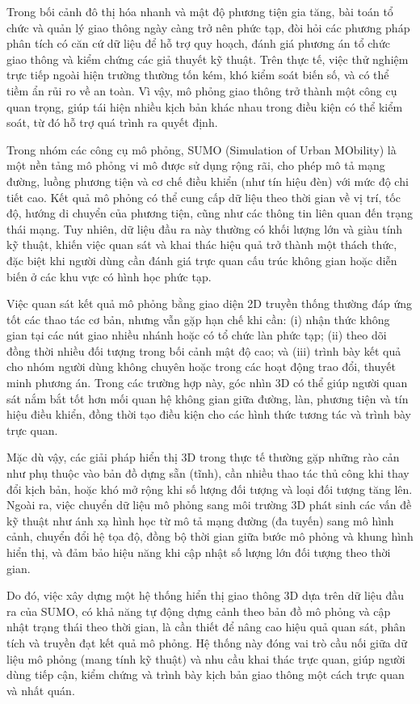 \documentclass[../DoAn.tex]{subfiles}
\begin{document}
Trong bối cảnh đô thị hóa nhanh và mật độ phương tiện gia tăng, bài toán tổ chức và quản lý giao thông ngày càng trở nên phức tạp, đòi hỏi các phương pháp phân tích có căn cứ dữ liệu để hỗ trợ quy hoạch, đánh giá phương án tổ chức giao thông và kiểm chứng các giả thuyết kỹ thuật. Trên thực tế, việc thử nghiệm trực tiếp ngoài hiện trường thường tốn kém, khó kiểm soát biến số, và có thể tiềm ẩn rủi ro về an toàn. Vì vậy, mô phỏng giao thông trở thành một công cụ quan trọng, giúp tái hiện nhiều kịch bản khác nhau trong điều kiện có thể kiểm soát, từ đó hỗ trợ quá trình ra quyết định.

Trong nhóm các công cụ mô phỏng, SUMO (Simulation of Urban MObility) là một nền tảng mô phỏng vi mô được sử dụng rộng rãi, cho phép mô tả mạng đường, luồng phương tiện và cơ chế điều khiển (như tín hiệu đèn) với mức độ chi tiết cao. Kết quả mô phỏng có thể cung cấp dữ liệu theo thời gian về vị trí, tốc độ, hướng di chuyển của phương tiện, cũng như các thông tin liên quan đến trạng thái mạng. Tuy nhiên, dữ liệu đầu ra này thường có khối lượng lớn và giàu tính kỹ thuật, khiến việc quan sát và khai thác hiệu quả trở thành một thách thức, đặc biệt khi người dùng cần đánh giá trực quan cấu trúc không gian hoặc diễn biến ở các khu vực có hình học phức tạp.

Việc quan sát kết quả mô phỏng bằng giao diện 2D truyền thống thường đáp ứng tốt các thao tác cơ bản, nhưng vẫn gặp hạn chế khi cần: (i) nhận thức không gian tại các nút giao nhiều nhánh hoặc có tổ chức làn phức tạp; (ii) theo dõi đồng thời nhiều đối tượng trong bối cảnh mật độ cao; và (iii) trình bày kết quả cho nhóm người dùng không chuyên hoặc trong các hoạt động trao đổi, thuyết minh phương án. Trong các trường hợp này, góc nhìn 3D có thể giúp người quan sát nắm bắt tốt hơn mối quan hệ không gian giữa đường, làn, phương tiện và tín hiệu điều khiển, đồng thời tạo điều kiện cho các hình thức tương tác và trình bày trực quan.

Mặc dù vậy, các giải pháp hiển thị 3D trong thực tế thường gặp những rào cản như phụ thuộc vào bản đồ dựng sẵn (tĩnh), cần nhiều thao tác thủ công khi thay đổi kịch bản, hoặc khó mở rộng khi số lượng đối tượng và loại đối tượng tăng lên. Ngoài ra, việc chuyển dữ liệu mô phỏng sang môi trường 3D phát sinh các vấn đề kỹ thuật như ánh xạ hình học từ mô tả mạng đường (đa tuyến) sang mô hình cảnh, chuyển đổi hệ tọa độ, đồng bộ thời gian giữa bước mô phỏng và khung hình hiển thị, và đảm bảo hiệu năng khi cập nhật số lượng lớn đối tượng theo thời gian.

Do đó, việc xây dựng một hệ thống hiển thị giao thông 3D dựa trên dữ liệu đầu ra của SUMO, có khả năng tự động dựng cảnh theo bản đồ mô phỏng và cập nhật trạng thái theo thời gian, là cần thiết để nâng cao hiệu quả quan sát, phân tích và truyền đạt kết quả mô phỏng. Hệ thống này đóng vai trò cầu nối giữa dữ liệu mô phỏng (mang tính kỹ thuật) và nhu cầu khai thác trực quan, giúp người dùng tiếp cận, kiểm chứng và trình bày kịch bản giao thông một cách trực quan và nhất quán.
\end{document}
